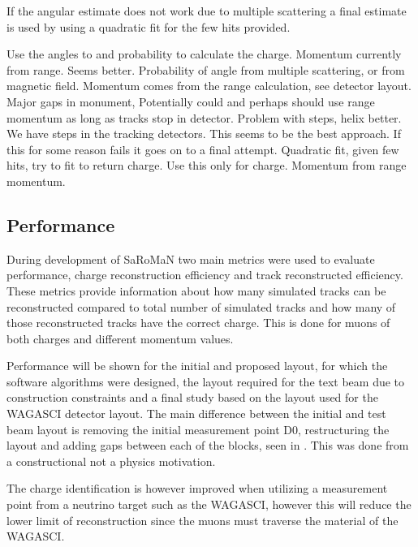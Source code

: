 If the angular estimate does not work due to multiple scattering a final estimate is used by using a quadratic fit for the few hits provided.

Use the angles to and probability to calculate the charge. Momentum currently from range. Seems better.
Probability of angle from multiple scattering, or from magnetic field. 
Momentum comes from the range calculation, see detector layout. Major gaps in monument,  Potentially could and perhaps should use range momentum as long as tracks stop in detector. Problem with steps, helix better.
We have steps in the tracking detectors.
This seems to be the best approach. If this for some reason fails it goes on to a final attempt.
Quadratic fit, given few hits, try to fit to return charge. Use this only for charge. Momentum from range momentum.
\fi

\subsection{Performance}


During development of SaRoMaN two main metrics were used to evaluate performance, charge reconstruction efficiency and track reconstructed efficiency. These metrics provide information about how many simulated tracks can be reconstructed compared to total number of simulated tracks and how many of those reconstructed tracks have the correct charge. This is done for muons of both charges and different momentum values.

Performance will be shown for the initial and proposed layout, for which the software algorithms were designed, the layout required for the text beam due to construction constraints and a final study based on the layout used for the WAGASCI detector layout. The main difference between the initial and test beam layout is removing the initial measurement point D0, restructuring  the layout and adding gaps between each of the blocks, seen in . This was done from a constructional not a physics motivation.

The charge identification is however improved when utilizing a measurement point from a neutrino target such as the WAGASCI, however this will reduce the lower limit of reconstruction since the muons must traverse the material of the WAGASCI. 

